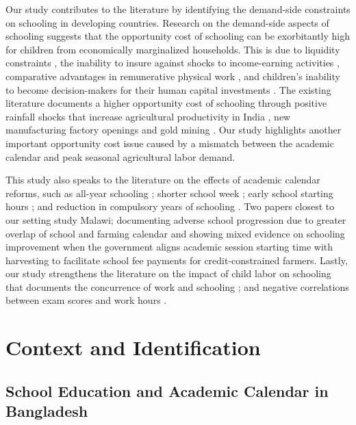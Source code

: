 \documentclass[12pt,letterpaper]{article}
\newcommand{\0}{\ensuremath{\mbox{\boldmath $0$}}}
\begin{document}
Our study contributes to the literature by identifying the demand-side constraints on schooling in developing countries. Research on the demand-side aspects of schooling suggests that the opportunity cost of schooling can be exorbitantly high for children from economically marginalized households. This is due to liquidity constraints  \citep{JacobySkoufias1997, BeegleDehejiaGatti2006}, the inability to insure against shocks to income-earning activities \citep{Jensen2000, deJanvryetal2006, Case2006}, comparative advantages in remunerative physical work \citep{PittRosenzweigHassan2010}, and children's inability to become decision-makers for their human capital investments \citep{BalandRobinson2000}. The existing literature documents a higher opportunity cost of schooling through positive rainfall shocks that increase agricultural productivity in India \citep{shah2017drought}, new manufacturing factory openings \citep{atkin2016endogenous} and gold mining \citep{santos2018blessing}. Our study highlights another important opportunity cost issue caused by a mismatch between the academic calendar and peak seasonal agricultural labor demand.

This study also speaks to the literature on the effects of academic calendar reforms, such as all-year schooling \citep{ mcmullen2012impact, graves2010academic}; shorter school week \citep{anderson2015does}; early school starting hours \citep{cortes2012role,  hinrichs2011bell, edwards2012early, carrell2011s}; and reduction in compulsory years of schooling \citep{elsayed2021less}. Two papers closest to our setting study Malawi; \cite{allen2024double} documenting adverse school progression due to greater overlap of school and farming calendar and \cite{dillon2021selling} showing mixed evidence on schooling improvement when the government aligns academic session starting time with harvesting to facilitate school fee payments for credit-constrained farmers. Lastly, our study strengthens the literature on the impact of child labor on schooling that documents the concurrence of work and schooling \citep{RavallionWodon2000, Edmonds2007, Dumas2012}; and negative correlations between exam scores and work hours \citep{AkabayashiPsacharopoulos1999, Heady2003, Gunnarsson2006}.


\section{Context and Identification\label{sec.id}}
\subsection{School Education and Academic Calendar in Bangladesh}
\end{document}

